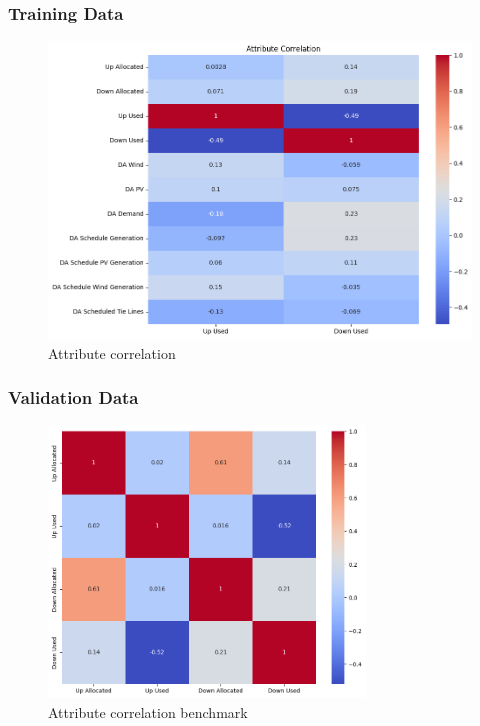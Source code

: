 \subsubsection{Training Data}





\begin{figure}[H]
    \centering
    \includegraphics[width=\textwidth]{plots/correlation_heatmap.png}
    \caption{Attribute correlation}
    \label{fig:Attribute_correlation}
  \end{figure}
  
  
  

\subsubsection{Validation Data}



% 


\begin{figure}[H]
    \centering
    \includegraphics[width=0.75\textwidth]{plots/correlation_heatmap_benchmark.png}
    \caption{Attribute correlation benchmark}
    \label{fig:Attribute_correlation_benchmark}
  \end{figure}
  
